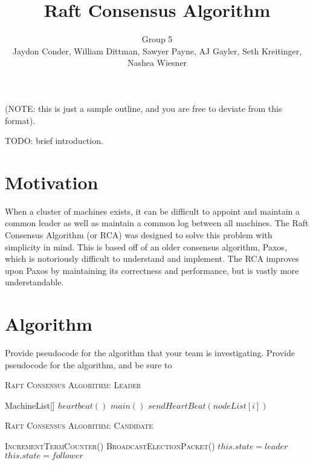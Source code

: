 \documentclass[11pt]{article}
\title{Raft Consensus Algorithm}
\author{Group 5 \\ 
\small{Jaydon Conder, William Dittman, Sawyer Payne, AJ Gayler, Seth Kreitinger, Nashea Wiesner}}
\begin{document}
\maketitle

(NOTE: this is just a sample outline, and you are free to deviate from this format).

TODO: brief introduction.

\section{Motivation}
When a cluster of machines exists, it can be difficult to appoint and maintain a common leader as well as maintain a common log between all machines. The Raft Consensus Algorithm (or RCA) was designed to solve this problem with simplicity in mind. This is based off of an older consensus algorithm, Paxos, which is notoriously difficult to understand and implement. The RCA improves upon Paxos by maintaining its correctness and performance, but is vastly more understandable. 

\section{Algorithm}
Provide pseudocode for the algorithm that your team is investigating.  Provide pseudocode for the algorithm, and be sure to 

\begin{algorithm}\caption{\textsc{Raft Consensus Algorithm: Leader}}
 \begin{algorithmic}[1]
    MachineList[] 
	\State $heartbeat () $
	\State $main() $
  {} 
   	\State $sendHeartBeat( nodeList[i]) $  
   \EndFor	{}
   \EndFunction
    {}
   \EndFunction
 \end{algorithmic}
\end{algorithm}

\begin{algorithm}\caption{\textsc{Raft Consensus Algorithm: Candidate}}
 \begin{algorithmic}[1]
 \State \textsc{IncrementTermCounter()} 
 \State \textsc{BroadcastElectionPacket()} 
  {}
	\State $this.state = leader $ 
 \EndFunction\
  {}
 	\State $this.state = follower $ 
 \EndFunction
\end{algorithmic}
\end{algorithm}
\end{document}
